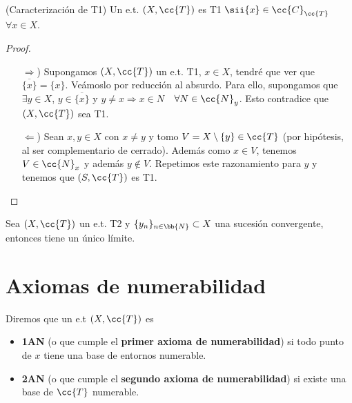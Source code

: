 \begin{prop}(Caracterización de T1)
    Un e.t. $(X, \cc{T})$ es T1 $\sii \{x\}\in \cc{C}_{\cc{T}}$\ \ $\forall x \in X$.

    \begin{proof}\
        \begin{itemize}
            \item[$\Rightarrow$)] Supongamos $(X, \cc{T})$ un e.t. T1, $x \in X$, tendré que ver que $\overline{\{x\}} = \{x\}$. Veámoslo por reducción al absurdo. Para ello, supongamos que $\exists y \in X$, $y\in \overline{\{x\}}$ y $y \neq x \Rightarrow x \in N$\ \ $\forall N \in \cc{N}_y$. Esto contradice que $(X, \cc{T})$ sea T1.
            \item[$\Leftarrow$)] Sean $x,y\in X$ con $x\neq y$ y tomo $V=X\setminus\{y\}\in \cc{T}$ (por hipótesis, al ser complementario de cerrado). Además como $x \in V$, tenemos $V\in \cc{N}_x$ y además $y\notin V$. Repetimos este razonamiento para $y$ y tenemos que $(S, \cc{T})$ es T1. 
        \end{itemize}
    \end{proof}
\end{prop}

\begin{ejercicio}
    Sea $(X, \cc{T})$ un e.t. T2 y $\{y_n\}_{n\in \bb{N}}\subset X$ una sucesión convergente, entonces tiene un único límite.
    \endsquare
\end{ejercicio}

\section{Axiomas de numerabilidad}

\begin{definicion}
    Diremos que un e.t $(X, \cc{T})$ es 
    \begin{itemize}
        \item \textbf{1AN} (o que cumple el \textbf{primer axioma de numerabilidad}) si todo punto de $x$ tiene una base de entornos numerable.
        \item \textbf{2AN} (o que cumple el \textbf{segundo axioma de numerabilidad}) si existe una base de $\cc{T}$ numerable.
    \end{itemize}
    \endsquare
\end{definicion}

